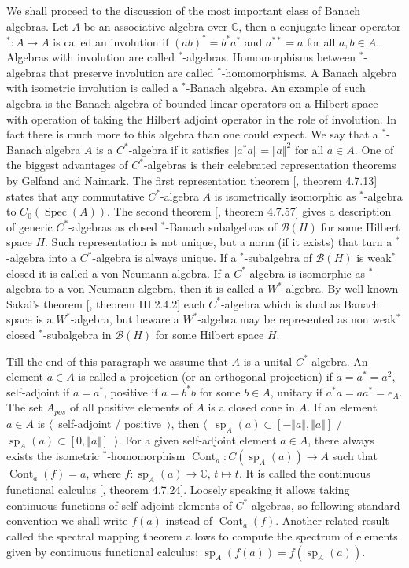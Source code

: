 We shall proceed to the discussion of the most important class of Banach
algebras. Let $A$ be an associative algebra over $\mathbb{C}$, then a conjugate
linear operator ${}^*:A\to A$ is called an involution if ${(ab)}^*=b^*a^*$ and
$a^{**}=a$ for all $a,b\in A$. Algebras with involution are called
${}^*$-algebras. Homomorphisms between ${}^*$-algebras that preserve involution
are called ${}^*$-homomorphisms. A Banach algebra with isometric involution is
called a ${}^*$-Banach algebra. An example of such algebra is the Banach algebra
of bounded linear operators on a Hilbert space with operation of taking the
Hilbert adjoint operator in the role of involution. In fact there is much more
to this algebra than one could expect. We say that a ${}^*$-Banach algebra $A$
is a $C^*$-algebra if it satisfies $\Vert a^*a\Vert=\Vert a\Vert^2$ for all
$a\in A$. One of the biggest advantages of $C^*$-algebras is their celebrated
representation theorems by Gelfand and Naimark. The first representation theorem
[\cite{HelBanLocConvAlg}, theorem 4.7.13] states that any commutative
$C^*$-algebra $A$ is isometrically isomorphic as ${}^*$-algebra to
$C_0(\operatorname{Spec}(A))$. The second theorem [\cite{HelBanLocConvAlg},
theorem 4.7.57] gives a description of generic $C^*$-algebras as closed
${}^*$-Banach subalgebras of $\mathcal{B}(H)$ for some Hilbert space $H$. Such
representation is not unique, but a norm (if it exists) that turn a
${}^*$-algebra into a $C^*$-algebra is always unique. If a ${}^*$-subalgebra of
$\mathcal{B}(H)$ is weak${}^*$ closed it is called a von Neumann algebra. If a
$C^*$-algebra is isomorphic as ${}^*$-algebra to a von Neumann algebra, then it is
called a $W^*$-algebra. By well known Sakai's theorem [\cite{BlackadarOpAlg},
theorem III.2.4.2] each $C^*$-algebra which is dual as Banach space is a
$W^*$-algebra, but beware a $W^*$-algebra may be represented as non weak${}^*$
closed ${}^*$-subalgebra in $\mathcal{B}(H)$ for some Hilbert space $H$. 

Till the end of this paragraph we assume that $A$ is a unital $C^*$-algebra. 
An element $a\in A$ is called a projection (or an orthogonal projection) 
if $a=a^*=a^2$, self-adjoint if $a=a^*$, positive if $a=b^*b$ for 
some $b\in A$, unitary if $a^*a=aa^*=e_A$. The set $A_{pos}$ of all positive 
elements of $A$ is a closed cone in $A$. If an element $a\in A$ 
is $\langle$~self-adjoint / positive~$\rangle$, then
$\langle$~$\operatorname{sp}_A(a)\subset[-\Vert a\Vert, \Vert a\Vert]$ /
$\operatorname{sp}_A(a)\subset[0,\Vert a\Vert]$~$\rangle$. For a given
self-adjoint element $a\in A$, there always exists the isometric
${}^*$-homomorphism $\operatorname{Cont}_a:C(\operatorname{sp}_A(a))\to A$ such
that $\operatorname{Cont}_a(f)=a$, where
$f:\operatorname{sp}_A(a)\to\mathbb{C},\, t\mapsto t$. It is called the continuous
functional calculus [\cite{HelBanLocConvAlg}, theorem 4.7.24]. Loosely speaking
it allows taking continuous functions of self-adjoint elements of
$C^*$-algebras, so following standard convention we shall write $f(a)$ instead
of $\operatorname{Cont}_a(f)$. Another related result called the spectral
mapping theorem allows to compute the spectrum of elements given by continuous
functional calculus: $\operatorname{sp}_A(f(a))=f(\operatorname{sp}_A(a))$.

